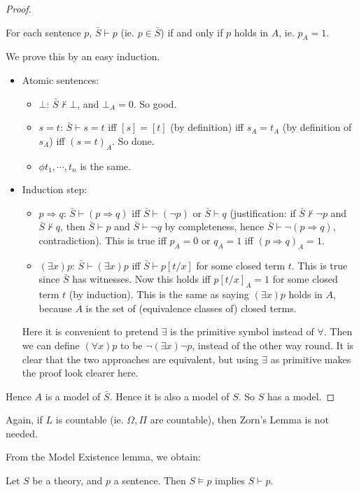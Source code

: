 \documentclass[a4paper]{article}
\begin{document}
\begin{proof}
  \begin{claim}
    For each sentence $p$, $\bar S\vdash p$ (ie. $p\in \bar S$) if and only if $p$ holds in $A$, ie. $p_A = 1$.
  \end{claim}
  We prove this by an easy induction.
  \begin{itemize}
    \item Atomic sentences:
      \begin{itemize}
        \item $\bot$: $\bar S \not\vdash \bot$, and $\bot_A = 0$. So good.
        \item $s = t$: $\bar S \vdash s = t$ iff $[s] = [t]$ (by definition) iff $s_A = t_A$ (by definition of $s_A$) iff $(s = t)_A$. So done.
        \item $\phi t_1, \cdots, t_n$ is the same.
      \end{itemize}
    \item Induction step:
      \begin{itemize}
        \item $p\Rightarrow q$: $\bar S\vdash (p \Rightarrow  q)$ iff $\bar S \vdash (\neg p)$ or $\bar S\vdash q$ (justification: if $\bar S \not\vdash \neg p$ and $\bar S\not\vdash q$, then $\bar S\vdash p$ and $\bar S \vdash \neg q$ by completeness, hence $\bar S\vdash \neg(p\Rightarrow q)$, contradiction). This is true iff $p_A = 0$ or $q_A = 1$ iff $(p\Rightarrow q)_A = 1$.
        \item $(\exists x)p$: $\bar S \vdash (\exists x)p$ iff $\bar S\vdash p[t/x]$ for some closed term $t$. This is true since $\bar S$ has witnesses. Now this holds iff $p[t/x]_A = 1$ for some closed term $t$ (by induction). This is the same as saying $(\exists x)p$ holds in $A$, because $A$ is the set of (equivalence classes of) closed terms.
      \end{itemize}
      Here it is convenient to pretend $\exists$ is the primitive symbol instead of $\forall$. Then we can define $(\forall x) p$ to be $\neg (\exists x)\neg p$, instead of the other way round. It is clear that the two approaches are equivalent, but using $\exists $ as primitive makes the proof look clearer here.
  \end{itemize}
  Hence $A$ is a model of $\bar S$. Hence it is also a model of $S$. So $S$ has a model.
\end{proof}
Again, if $L$ is countable (ie. $\Omega, \Pi$ are countable), then Zorn's Lemma is not needed.

From the Model Existence lemma, we obtain:
\begin{cor}[Adequacy]
  Let $S$ be a theory, and $p$ a sentence. Then $S\models p$ implies $S\vdash p$.
\end{cor}
\end{document}
